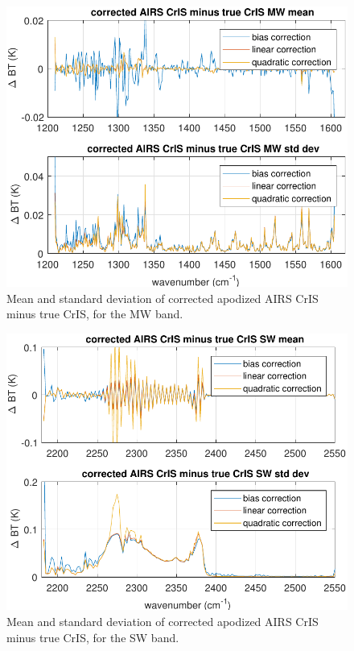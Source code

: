 \documentclass[journal]{IEEEtran}
\begin{document}
\begin{figure} %
  \centering
  \includegraphics[width=\linewidth]{figures/a2cris_regr_MW.pdf}
  \caption{Mean and standard deviation of corrected apodized AIRS
    CrIS minus true CrIS, for the MW band.}
  \label{statMW}
\end{figure}

\begin{figure} %
  \centering
  \includegraphics[width=\linewidth]{figures/a2cris_regr_SW.pdf}
  \caption{Mean and standard deviation of corrected apodized AIRS
    CrIS minus true CrIS, for the SW band.}
  \label{statSW}
\end{figure}
\end{document}
